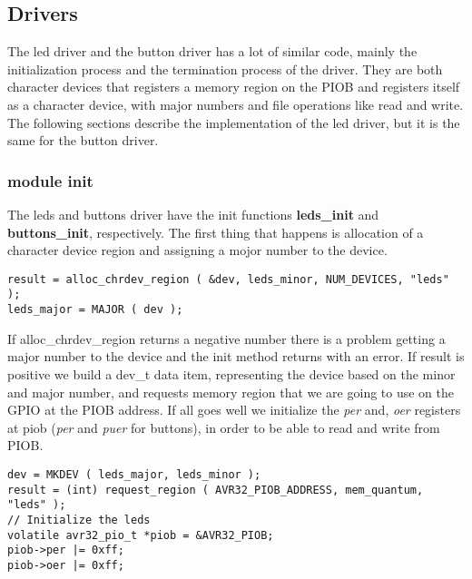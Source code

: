 \subsection{Drivers}
The led driver and the button driver has a lot of similar code, mainly 
the initialization process and the termination process of the driver. 
They are both character devices that registers a memory region on the 
PIOB and registers itself as a character device, with major numbers and 
file operations like read and write. The following sections 
describe the implementation of the led driver, but it is the same for
the button driver.

\subsubsection{module init}
The leds and buttons driver have the init functions \textbf{leds\_init}
and \textbf{buttons\_init}, respectively.
The first thing that happens is allocation of a character device region
and assigning a mojor number to the device.
\begin{lstlisting}
result = alloc_chrdev_region ( &dev, leds_minor, NUM_DEVICES, "leds" );
leds_major = MAJOR ( dev );
\end{lstlisting}
If alloc\_chrdev\_region returns a negative number there is a problem getting
a major number to the device and the init method returns with an error.
If result is positive we build a dev\_t data item, 
representing the device based on the minor and major number, and requests memory region that we are going to use on the GPIO at the PIOB address.
If all goes well we initialize the \textit{per} and, 
\textit{oer} registers at piob (\textit{per} and \textit{puer}
for buttons), in order to be able to read and write from PIOB.
\begin{lstlisting}
dev = MKDEV ( leds_major, leds_minor );
result = (int) request_region ( AVR32_PIOB_ADDRESS, mem_quantum, "leds" );
// Initialize the leds
volatile avr32_pio_t *piob = &AVR32_PIOB;
piob->per |= 0xff;
piob->oer |= 0xff;
\end{lstlisting}